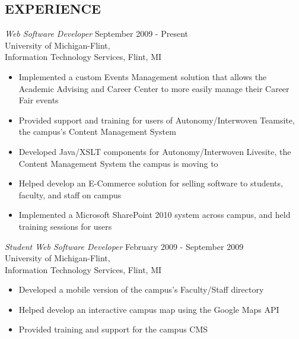 \documentclass[line,margin]{res}
\begin{document}
\begin{resume}
\section{EXPERIENCE}
    {\sl Web Software Developer }
            \hfill September 2009 - Present \\
                   University of Michigan-Flint, \\
                   Information Technology Services, Flint, MI
        \vspace{2 mm}
        \begin{itemize}
            \item Implemented a custom Events Management solution that
                  allows the Academic Advising and Career Center to
                  more easily manage their Career Fair events
            \item Provided support and training for users of Autonomy/Interwoven
                  Teamsite, the campus's Content Management System
            \item Developed Java/XSLT components for Autonomy/Interwoven Livesite, the
                  Content Management System the campus is moving to
            \item Helped develop an E-Commerce solution for selling software
                  to students, faculty, and staff on campus
            \item Implemented a Microsoft SharePoint 2010 system across
                  campus, and held training sessions for users \\
        \end{itemize}

    {\sl Student Web Software Developer }
            \hfill February 2009 - September 2009 \\
                   University of Michigan-Flint, \\
                   Information Technology Services, Flint, MI
        \vspace{2 mm}
        \begin{itemize}
            \item Developed a mobile version of the campus's Faculty/Staff
                  directory
            \item Helped develop an interactive campus map using the
                  Google Maps API
            \item Provided training and support for the campus CMS
        \end{itemize}


\end{resume}
\end{document}
